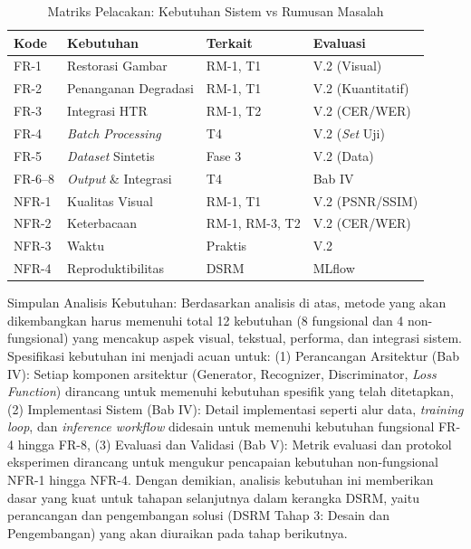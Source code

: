 \documentclass[12pt,a4paper]{article}
\begin{document}
\begin{table}[htbp!]
    \centering
    \small
    \caption{Matriks Pelacakan: Kebutuhan Sistem vs Rumusan Masalah}
    \label{tab:traceability-matrix}
    \begin{tabular}{p{}p{}p{}p{}}
        \toprule
        \textbf{Kode} & \textbf{Kebutuhan}   & \textbf{Terkait} & \textbf{Evaluasi}   \\
        \midrule
        FR-1          & Restorasi Gambar     & RM-1, T1         & V.2 (Visual)        \\
        \midrule
        FR-2          & Penanganan Degradasi & RM-1, T1         & V.2 (Kuantitatif)   \\
        \midrule
        FR-3          & Integrasi HTR        & RM-1, T2         & V.2 (CER/WER)       \\
        \midrule
        FR-4          & \textit{Batch Processing}     & T4               & V.2 (\textit{Set} Uji)       \\
        \midrule
        FR-5          & \textit{Dataset} Sintetis     & Fase 3           & V.2 (Data)          \\
        \midrule
        FR-6--8       & \textit{Output} \& Integrasi  & T4               & Bab IV              \\
        \midrule
        NFR-1         & Kualitas Visual      & RM-1, T1         & V.2 (PSNR/SSIM)     \\
        \midrule
        NFR-2         & Keterbacaan          & RM-1, RM-3, T2   & V.2 (CER/WER)       \\
        \midrule
        NFR-3         & Waktu                & Praktis          & V.2\footnotemark[1] \\
        \midrule
        NFR-4         & Reproduktibilitas      & DSRM             & MLflow              \\
        \bottomrule
    \end{tabular}
\end{table}


Simpulan Analisis Kebutuhan: Berdasarkan analisis di atas, metode yang akan dikembangkan harus memenuhi total 12 kebutuhan (8 fungsional dan 4 non-fungsional) yang mencakup aspek visual, tekstual, performa, dan integrasi sistem. Spesifikasi kebutuhan ini menjadi acuan untuk: (1) Perancangan Arsitektur (Bab IV): Setiap komponen arsitektur (Generator, Recognizer, Discriminator, \textit{Loss Function}) dirancang untuk memenuhi kebutuhan spesifik yang telah ditetapkan, (2) Implementasi Sistem (Bab IV): Detail implementasi seperti alur data, \textit{training loop}, dan \textit{inference workflow} didesain untuk memenuhi kebutuhan fungsional FR-4 hingga FR-8, (3) Evaluasi dan Validasi (Bab V): Metrik evaluasi dan protokol eksperimen dirancang untuk mengukur pencapaian kebutuhan non-fungsional NFR-1 hingga NFR-4. Dengan demikian, analisis kebutuhan ini memberikan dasar yang kuat untuk tahapan selanjutnya dalam kerangka DSRM, yaitu perancangan dan pengembangan solusi (DSRM Tahap 3: Desain dan Pengembangan) yang akan diuraikan pada tahap berikutnya.
\end{document}
